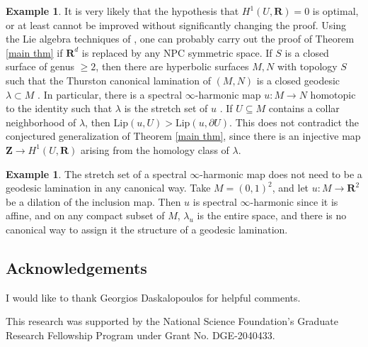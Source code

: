 \documentclass[reqno,11pt]{amsart}
\newcommand{\ZZ}{\mathbf{Z}}
\newcommand{\RR}{\mathbf{R}}
\newcommand{\Ball}{\mathbf{B}}
\newcommand{\Lip}{\mathrm{Lip}}
\theoremstyle{definition}
\newtheorem{example}[theorem]{Example}
\numberwithin{equation}{section}
\begin{document}
\begin{example}
It is very likely that the hypothesis that $H^1(U, \RR) = 0$ is optimal, or at least cannot be improved without significantly changing the proof.
Using the Lie algebra techniques of \cite[\S3]{daskalopoulos2022analytic}, one can probably carry out the proof of Theorem \ref{main thm} if $\RR^d$ is replaced by any NPC symmetric space.
If $S$ is a closed surface of genus $\geq 2$, then there are hyperbolic surfaces $M, N$ with topology $S$ such that the Thurston canonical lamination of $(M, N)$ is a closed geodesic $\lambda \subset M$ \cite[Theorem 10.7]{thurston1998minimal}.
In particular, there is a spectral $\infty$-harmonic map $u: M \to N$ homotopic to the identity such that $\lambda$ is the stretch set of $u$ \cite[Theorem 8.11]{daskalopoulos2022analytic}.
If $U \subseteq M$ contains a collar neighborhood of $\lambda$, then $\Lip(u, U) > \Lip(u, \partial U)$.
This does not contradict the conjectured generalization of Theorem \ref{main thm}, since there is an injective map $\ZZ \to H^1(U, \RR)$ arising from the homology class of $\lambda$.
\end{example}

\begin{example}
The stretch set of a spectral $\infty$-harmonic map does not need to be a geodesic lamination in any canonical way.
Take $M = (0, 1)^2$, and let $u: M \to \RR^2$ be a dilation of the inclusion map.
Then $u$ is spectral $\infty$-harmonic since it is affine, and on any compact subset of $M$, $\lambda_u$ is the entire space, and there is no canonical way to assign it the structure of a geodesic lamination.
\end{example}

\subsection{Acknowledgements}
I would like to thank Georgios Daskalopoulos for helpful comments.

This research was supported by the National Science Foundation's Graduate Research Fellowship Program under Grant No. DGE-2040433.

\end{document}
